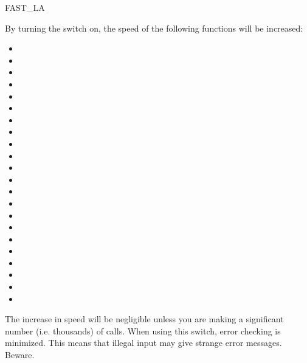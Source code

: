 \begin{Switch}[fastla]{FAST_LA}

By turning the  switch on, the speed of the following
functions will be increased:

\begin{itemize}
\item {}
\item {} 
\item {}
\item {}
\item {}
\item {}
\item {}
\item {}
\item {}
\item {}
\item {}
\item {}
\item {}
\item {}
\item {}
\item {}
\item {}
\item {}
\item {}
\item {}
\item {} 
\item {}                                 
\end{itemize}              

The increase in speed will be negligible unless you are making a
significant number (i.e. thousands) of calls. When using this switch,
error checking is minimized. This means that illegal input may give
strange error messages. Beware.
\end{Switch}

